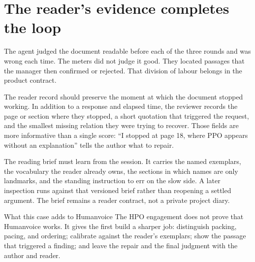 \section{The reader's evidence completes the loop}
\label{sec:hpo-reader-evidence}

The agent judged the document readable before each of the three rounds and was
wrong each time. The meters did not judge it good. They located passages that
the manager then confirmed or rejected. That division of labour belongs in the
product contract.

The reader record should preserve the moment at which the document stopped
working. In addition to a response and elapsed time, the reviewer records the
page or section where they stopped, a short quotation that triggered the
request, and the smallest missing relation they were trying to recover. Those
fields are more informative than a single score: ``I stopped at page 18,
where PPO appears without an explanation'' tells the author what to repair.

The reading brief must learn from the session. It carries the named exemplars,
the vocabulary the reader already owns, the sections in which names are only
landmarks, and the standing instruction to err on the slow side. A later
inspection runs against that versioned brief rather than reopening a settled
argument. The brief remains a reader contract, not a private project diary.

\begin{takeawaybox}{What this case adds to Humanvoice}
The HPO engagement does not prove that Humanvoice works. It gives the first
build a sharper job: distinguish packing, pacing, and ordering; calibrate
against the reader's exemplars; show the passage that triggered a finding; and
leave the repair and the final judgment with the author and reader.
\end{takeawaybox}
